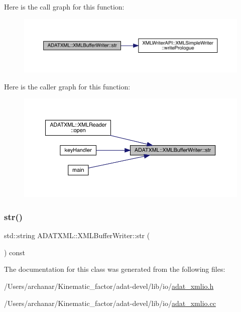 Here is the call graph for this function\+:
\nopagebreak
\begin{figure}[H]
\begin{center}
\leavevmode
\includegraphics[width=350pt]{d7/de9/classADATXML_1_1XMLBufferWriter_a3980a9a10a3616f76b7403c69c4006f0_cgraph}
\end{center}
\end{figure}
Here is the caller graph for this function\+:
\nopagebreak
\begin{figure}[H]
\begin{center}
\leavevmode
\includegraphics[width=350pt]{d7/de9/classADATXML_1_1XMLBufferWriter_a3980a9a10a3616f76b7403c69c4006f0_icgraph}
\end{center}
\end{figure}
\mbox{\label{classADATXML_1_1XMLBufferWriter_a12021e9b23e88cb760f4b64a8e845e5e}} 
\subsubsection{\texorpdfstring{str()}{str()}\hspace{0.1cm}{\footnotesize\ttfamily [3/3]}}
{\footnotesize\ttfamily std\+::string A\+D\+A\+T\+X\+M\+L\+::\+X\+M\+L\+Buffer\+Writer\+::str (\begin{DoxyParamCaption}{ }\end{DoxyParamCaption}) const}



The documentation for this class was generated from the following files\+:\begin{DoxyCompactItemize}
\item 
/\+Users/archanar/\+Kinematic\+\_\+factor/adat-\/devel/lib/io/\mbox{\hyperlink{adat-devel_2lib_2io_2adat__xmlio_8h}{adat\+\_\+xmlio.\+h}}\item 
/\+Users/archanar/\+Kinematic\+\_\+factor/adat-\/devel/lib/io/\mbox{\hyperlink{adat-devel_2lib_2io_2adat__xmlio_8cc}{adat\+\_\+xmlio.\+cc}}\end{DoxyCompactItemize}
